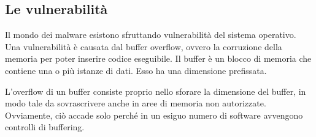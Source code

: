 \documentclass[a4]{article}
\begin{document}
\subsection{Le vulnerabilità}
Il mondo dei malware esistono sfruttando vulnerabilità del sistema operativo. Una vulnerabilità è causata dal buffer overflow, ovvero la corruzione della memoria per poter inserire codice eseguibile. Il buffer è un blocco di memoria che contiene una o più istanze di dati. Esso ha una dimensione prefissata.

L'overflow di un buffer consiste proprio nello sforare la dimensione del buffer, in modo tale da sovrascrivere anche in aree di memoria non autorizzate. Ovviamente, ciò accade solo perché in un esiguo numero di software avvengono controlli di buffering.
\end{document}
